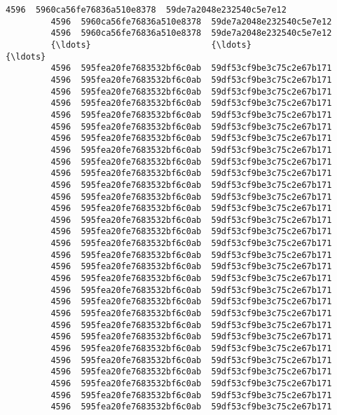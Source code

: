 \documentclass[11pt]{article}
\begin{document}
\begin{Verbatim}[commandchars=\\\{\}]
         4596  5960ca56fe76836a510e8378  59de7a2048e232540c5e7e12   
         4596  5960ca56fe76836a510e8378  59de7a2048e232540c5e7e12   
         4596  5960ca56fe76836a510e8378  59de7a2048e232540c5e7e12   
         {\ldots}                        {\ldots}                       {\ldots}   
         4596  595fea20fe7683532bf6c0ab  59df53cf9be3c75c2e67b171   
         4596  595fea20fe7683532bf6c0ab  59df53cf9be3c75c2e67b171   
         4596  595fea20fe7683532bf6c0ab  59df53cf9be3c75c2e67b171   
         4596  595fea20fe7683532bf6c0ab  59df53cf9be3c75c2e67b171   
         4596  595fea20fe7683532bf6c0ab  59df53cf9be3c75c2e67b171   
         4596  595fea20fe7683532bf6c0ab  59df53cf9be3c75c2e67b171   
         4596  595fea20fe7683532bf6c0ab  59df53cf9be3c75c2e67b171   
         4596  595fea20fe7683532bf6c0ab  59df53cf9be3c75c2e67b171   
         4596  595fea20fe7683532bf6c0ab  59df53cf9be3c75c2e67b171   
         4596  595fea20fe7683532bf6c0ab  59df53cf9be3c75c2e67b171   
         4596  595fea20fe7683532bf6c0ab  59df53cf9be3c75c2e67b171   
         4596  595fea20fe7683532bf6c0ab  59df53cf9be3c75c2e67b171   
         4596  595fea20fe7683532bf6c0ab  59df53cf9be3c75c2e67b171   
         4596  595fea20fe7683532bf6c0ab  59df53cf9be3c75c2e67b171   
         4596  595fea20fe7683532bf6c0ab  59df53cf9be3c75c2e67b171   
         4596  595fea20fe7683532bf6c0ab  59df53cf9be3c75c2e67b171   
         4596  595fea20fe7683532bf6c0ab  59df53cf9be3c75c2e67b171   
         4596  595fea20fe7683532bf6c0ab  59df53cf9be3c75c2e67b171   
         4596  595fea20fe7683532bf6c0ab  59df53cf9be3c75c2e67b171   
         4596  595fea20fe7683532bf6c0ab  59df53cf9be3c75c2e67b171   
         4596  595fea20fe7683532bf6c0ab  59df53cf9be3c75c2e67b171   
         4596  595fea20fe7683532bf6c0ab  59df53cf9be3c75c2e67b171   
         4596  595fea20fe7683532bf6c0ab  59df53cf9be3c75c2e67b171   
         4596  595fea20fe7683532bf6c0ab  59df53cf9be3c75c2e67b171   
         4596  595fea20fe7683532bf6c0ab  59df53cf9be3c75c2e67b171   
         4596  595fea20fe7683532bf6c0ab  59df53cf9be3c75c2e67b171   
         4596  595fea20fe7683532bf6c0ab  59df53cf9be3c75c2e67b171   
         4596  595fea20fe7683532bf6c0ab  59df53cf9be3c75c2e67b171   
         4596  595fea20fe7683532bf6c0ab  59df53cf9be3c75c2e67b171   
         4596  595fea20fe7683532bf6c0ab  59df53cf9be3c75c2e67b171   
         

\end{Verbatim}
\end{document}
